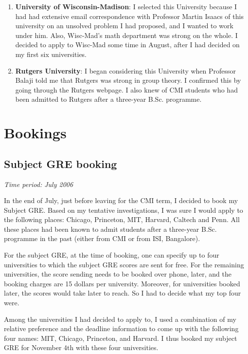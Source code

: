 \documentclass[a4paper]{amsart}
\begin{document}
\begin{enumerate}
\item {\bf University of Wisconsin-Madison}: I selected this University
  because I had had extensive email correspondence with Professor
  Martin Isaacs of this university on an unsolved problem I had proposed,
  and I wanted to work under him. Also, Wisc-Mad's math department was
  strong on the whole. I decided to apply to Wisc-Mad some time in August,
  after I had decided on my first six universities.

\item {\bf Rutgers University}: I began considering this University
  when Professor Balaji told me that Rutgers was strong in group theory.
  I confirmed this by going through the Rutgers webpage. I also knew
  of CMI students who had been admitted to Rutgers after a three-year B.Sc.
  programme.

\end{enumerate}

\section{Bookings}

\subsection{Subject GRE booking}

{\em Time period: July 2006}

In the end of July, just before leaving for the CMI term, I decided to
book my Subject GRE.  Based on my tentative investigations, I was sure
I would apply to the following places: Chicago, Princeton, MIT,
Harvard, Caltech and Penn. All these places had been known to admit
students after a three-year B.Sc. programme in the past (either from
CMI or from ISI, Bangalore).

For the subject GRE, at the time of booking, one can specify
up to four universities to which the subject GRE scores
are sent for free. For the remaining universities, the score sending
needs to be booked over phone, later, and the booking charges
are 15 dollars per university. Moreover, for universities booked later,
the scores would take later to reach. So I had to decide what
my top four were.

Among the universities I had decided to apply to, I used a combination
of my relative preference and the deadline information to come up with
the following four names: MIT, Chicago, Princeton, and Harvard. I thus booked
my subject GRE for November 4th with these four universities.
\end{document}
